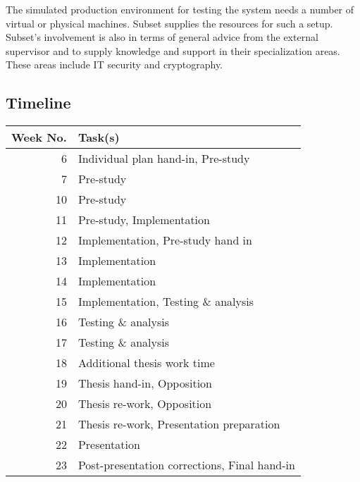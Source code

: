 \documentclass{article}
\begin{document}
The simulated production environment for testing the system needs a number of virtual or physical machines. Subset supplies the resources for such a setup. Subset's involvement is also in terms of general advice from the external supervisor and to supply knowledge and support in their specialization areas. These areas include IT security and cryptography.

\subsection*{Timeline}

\begin{figure*}[h!]
	\begin{tabular}{r|l}
		Week No. & Task(s)                                      \\
		\hline
		6        & Individual plan hand-in, Pre-study           \\
		7        & Pre-study                                    \\
		10       & Pre-study                                    \\
		11       & Pre-study, Implementation                    \\
		12       & Implementation, Pre-study hand in            \\
		13       & Implementation                               \\
		14       & Implementation                               \\
		15       & Implementation, Testing \& analysis          \\
		16       & Testing \& analysis                          \\
		17       & Testing \& analysis                          \\
		18       & Additional thesis work time                  \\
		19       & Thesis hand-in, Opposition                   \\
		20       & Thesis re-work, Opposition                   \\
		21       & Thesis re-work, Presentation preparation     \\
		22       & Presentation                                 \\
		23       & Post-presentation corrections, Final hand-in \\
																																																																																																																																																																																																						
	\end{tabular}
\end{figure*}

\printglossaries



\end{document}
